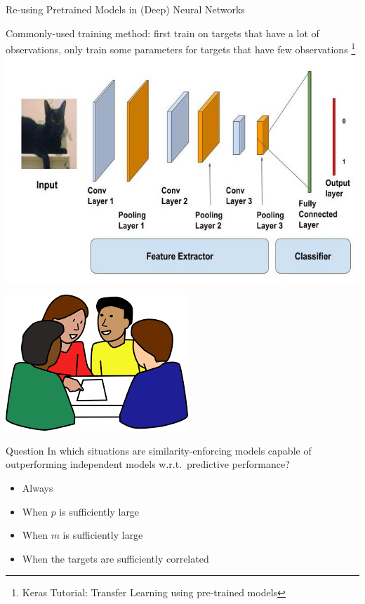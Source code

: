 \documentclass[]{beamer}
\begin{document}
\begin{frame}{Re-using Pretrained Models in (Deep) Neural Networks}
\begin{center}
Commonly-used training method: first train on targets that have a lot of observations, only train some parameters for targets that have few observations \footnote{Keras Tutorial: Transfer Learning using pre-trained models } \\
\includegraphics[scale=0.4]{Figures/pretrain2}
\end{center}
\end{frame}

\begin{frame}

\begin{center}
\includegraphics[scale=0.5]{Figures/interaction}
\end{center}
\begin{exampleblock}{Question}
In which situations are similarity-enforcing models capable of outperforming independent models w.r.t.\ predictive performance? 
\begin{itemize}
\item Always
\item When $p$ is sufficiently large
\item When $m$ is sufficiently large
\item When the targets are sufficiently correlated
\end{itemize}
\end{exampleblock}
\end{frame}
\end{document}
